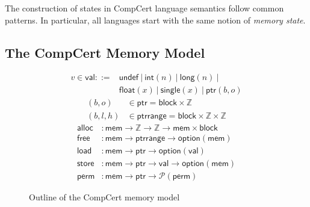 \documentclass[sigplan,10pt,review,anonymous]{acmart}\settopmatter{printfolios=true,printccs=false,printacmref=false}
\newcommand{\kw}[1]{\ensuremath{ \mathsf{#1} }}
\newcommand{\alt}{\ |\ } %
\begin{document}
%

The construction of states in CompCert language semantics
follow common patterns.
In particular,
all languages start with
the same notion of \emph{memory state}.


\subsection{The CompCert Memory Model} \label{sec:sem:mm} %

\begin{figure} %
  \begin{align*}
    v \in \kw{val} ::= {} &
          \kw{undef} \alt
          \kw{int}(n) \alt
          \kw{long}(n) \alt \\ &
          \kw{float}(x) \alt
          \kw{single}(x) \alt
          \kw{ptr}(b, o)
  \end{align*}
  \begin{align*}
    (b, o) &\in \kw{ptr} =
      \kw{block} \times \mathbb{Z}
    \\
    (b, l, h) &\in \kw{ptrrange} =
      \kw{block} \times \mathbb{Z} \times \mathbb{Z}
  \end{align*}
  \begin{align*}
    \kw{alloc} &:
      \kw{mem} \rightarrow \mathbb{Z} \rightarrow \mathbb{Z} \rightarrow
      \kw{mem} \times \kw{block}
    \\
    \kw{free} &:
      \kw{mem} \rightarrow
      \kw{ptrrange} \rightarrow
      \kw{option}(\kw{mem})
    \\
    \kw{load} &:
      \kw{mem} \rightarrow \kw{ptr} \rightarrow \kw{option}(\kw{val})
    \\
    \kw{store} &:
      \kw{mem} \rightarrow \kw{ptr} \rightarrow \kw{val} \rightarrow \kw{option}(\kw{mem})
    \\
    \kw{perm} &:
      \kw{mem} \rightarrow \kw{ptr} \rightarrow \mathcal{P}(\kw{perm})
  \end{align*}
  \caption{Outline of the CompCert memory model}
  \label{fig:mm}
\end{figure}
\end{document}
